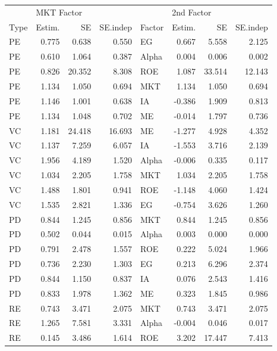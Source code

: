 \documentclass[12pt]{article}
\begin{document}
\begin{table}[ht]
	\centering
	\begin{tabular}{lrrrlrrr}
		 & \multicolumn{3}{l}{MKT Factor} & & \multicolumn{3}{l}{2nd Factor} \\ 
		Type & Estim. & SE & SE.indep & Factor & Estim. & SE & SE.indep \\ 
		\hline
		\hline
PE & 0.775 & 0.638 & 0.550 & EG & 0.667 & 5.558 & 2.125 \\ 
PE & 0.610 & 1.064 & 0.387 & Alpha & 0.004 & 0.006 & 0.002 \\ 
PE & 0.826 & 20.352 & 8.308 & ROE & 1.087 & 33.514 & 12.143 \\ 
PE & 1.134 & 1.050 & 0.694 & MKT & 1.134 & 1.050 & 0.694 \\ 
PE & 1.146 & 1.001 & 0.638 & IA & -0.386 & 1.909 & 0.813 \\ 
PE & 1.134 & 1.048 & 0.702 & ME & -0.014 & 1.797 & 0.736 \\ 
\hline
VC & 1.181 & 24.418 & 16.693 & ME & -1.277 & 4.928 & 4.352 \\ 
VC & 1.137 & 7.259 & 6.057 & IA & -1.553 & 3.716 & 2.139 \\ 
VC & 1.956 & 4.189 & 1.520 & Alpha & -0.006 & 0.335 & 0.117 \\ 
VC & 1.034 & 2.205 & 1.758 & MKT & 1.034 & 2.205 & 1.758 \\ 
VC & 1.488 & 1.801 & 0.941 & ROE & -1.148 & 4.060 & 1.424 \\ 
VC & 1.535 & 2.821 & 1.336 & EG & -0.754 & 3.626 & 1.260 \\ 
\hline
PD & 0.844 & 1.245 & 0.856 & MKT & 0.844 & 1.245 & 0.856 \\ 
PD & 0.502 & 0.044 & 0.015 & Alpha & 0.003 & 0.000 & 0.000 \\ 
PD & 0.791 & 2.478 & 1.557 & ROE & 0.222 & 5.024 & 1.966 \\ 
PD & 0.736 & 2.230 & 1.303 & EG & 0.213 & 6.296 & 2.374 \\ 
PD & 0.844 & 1.150 & 0.837 & IA & 0.076 & 2.543 & 1.416 \\ 
PD & 0.833 & 1.978 & 1.362 & ME & 0.323 & 1.845 & 0.986 \\ 
\hline
RE & 0.743 & 3.471 & 2.075 & MKT & 0.743 & 3.471 & 2.075 \\ 
RE & 1.265 & 7.581 & 3.331 & Alpha & -0.004 & 0.046 & 0.017 \\ 
RE & 0.145 & 3.486 & 1.614 & ROE & 3.202 & 17.447 & 7.413 \\ 

\end{tabular}
\end{table}
\end{document}

